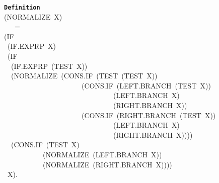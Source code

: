 \documentclass[11pt]{book}
\newenvironment{pubasis}{\begin{flushleft}\ttfamily\small}{\normalsize\rmfamily\end{flushleft}}
\newcommand{\axiomordefinition}[1]{\vspace{6pt}\texttt{\textbf{#1}}}
\begin{document}
\begin{pubasis}
~~~~~~~~\axiomordefinition{Definition}\\
~~~~~~~~(NORMALIZE~X)\\
~~~~~~~~~~~=\\
~~~~~~~~(IF\\
~~~~~~~~~(IF.EXPRP~X)\\
~~~~~~~~~(IF\\
~~~~~~~~~~(IF.EXPRP~(TEST~X))\\
~~~~~~~~~~(NOR\-MAL\-IZE~(CONS.IF~(TEST~(TEST~X))\\
~~~~~~~~~~~~~~~~~~~~~~~~~~~~~~(CONS.IF~(LEFT.BRANCH~(TEST~X))\\
~~~~~~~~~~~~~~~~~~~~~~~~~~~~~~~~~~~~~~~(LEFT.BRANCH~X)\\
~~~~~~~~~~~~~~~~~~~~~~~~~~~~~~~~~~~~~~~(RIGHT.BRANCH~X))\\
~~~~~~~~~~~~~~~~~~~~~~~~~~~~~~(CONS.IF~(RIGHT.BRANCH~(TEST~X))\\
~~~~~~~~~~~~~~~~~~~~~~~~~~~~~~~~~~~~~~~(LEFT.BRANCH~X)\\
~~~~~~~~~~~~~~~~~~~~~~~~~~~~~~~~~~~~~~~(RIGHT.BRANCH~X))))\\
~~~~~~~~~~(CONS.IF~(TEST~X)\\
~~~~~~~~~~~~~~~~~~~(NOR\-MAL\-IZE~(LEFT.BRANCH~X))\\
~~~~~~~~~~~~~~~~~~~(NOR\-MAL\-IZE~(RIGHT.BRANCH~X))))\\
~~~~~~~~~X).\\
\end{pubasis}
\end{document}
